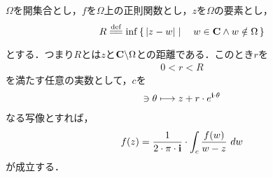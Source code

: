 	\begin{screen}
		\begin{thm}[円周上の積分公式]
			$\Omega$を開集合とし，$f$を$\Omega$上の正則関数とし，$z$を$\Omega$の要素とし，
			\begin{align}
				R \defeq \inf{}{\Set{|z-w|}{w \in \C \wedge w \notin \Omega}}
			\end{align}
			とする．つまり$R$とは$z$と$\mathbf{C} \backslash \Omega$との距離である．このとき$r$を
			\begin{align}
				0 < r < R
			\end{align}
			を満たす任意の実数として，$c$を
			\begin{align}
				[0,2 \cdot \pi] \ni \theta \longmapsto z + r \cdot e^{\isym \cdot \theta}
			\end{align}
			なる写像とすれば，
			\begin{align}
				f(z) = \frac{1}{2 \cdot \pi \cdot \mathbf{i}} \cdot \int_{c} \frac{f(w)}{w - z}\ dw
			\end{align}
			が成立する．
		\end{thm}
	\end{screen}
	
